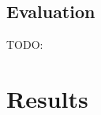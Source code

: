 \documentclass[acmtog]{acmart}
\begin{document}


\subsection{Evaluation}

TODO: 

\section{Results}


\end{document}
